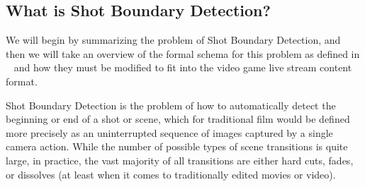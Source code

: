 \documentclass[12pt]{article}
\begin{document}
\subsection{What is Shot Boundary Detection?}
We will begin by summarizing the problem of Shot Boundary Detection, and then we will take an overview of the formal schema for this problem as defined in ~\cite{survey1}
and how they must be modified to fit into the video game live stream content format.

Shot Boundary Detection is the problem of how to automatically detect the beginning or end of a shot or scene, which for traditional 
film would be defined more precisely as an uninterrupted sequence of images captured by a single camera action. 
While the number of possible types of scene transitions is quite large, in practice, the vast majority of all transitions are either hard cuts, fades,
or dissolves (at least when it comes to traditionally edited movies or video). 
\end{document}

